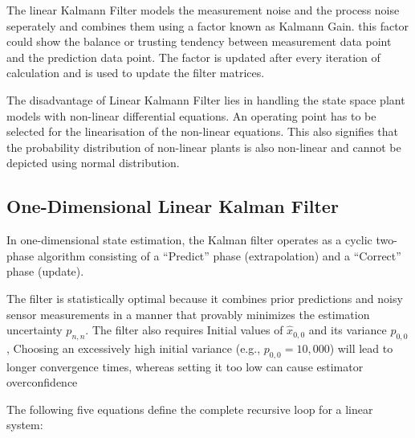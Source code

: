 The linear Kalmann Filter models the measurement noise and the process noise seperately and combines them using a factor known as Kalmann Gain. this factor could show the balance or trusting tendency between measurement data point and the prediction data point. The factor is updated after every iteration of calculation and is used to update the filter matrices.

The disadvantage of Linear Kalmann Filter lies in handling the state space plant models with non-linear differential equations. An operating point has to be selected for the linearisation of the non-linear equations. This also signifies that the probability distribution of non-linear plants is also non-linear and cannot be depicted using normal distribution. 

\subsection{One-Dimensional Linear Kalman Filter}
\label{sec:kalman_filter_1d}

In one-dimensional state estimation, the Kalman filter operates as a cyclic two-phase algorithm consisting of a \enquote{Predict} phase (extrapolation) and a \enquote{Correct} phase (update).%

The filter is statistically optimal because it combines prior predictions and noisy sensor measurements in a manner that provably minimizes the estimation uncertainty $p_{n,n}$. The filter also requires Initial values of $\hat{x}_{0,0}$ and its variance $p_{0,0}$, Choosing an excessively high initial variance (e.g., $p_{0,0}=10{,}000$) will lead to longer convergence times, whereas setting it too low can cause estimator overconfidence

The following five equations define the complete recursive loop for a linear system:

